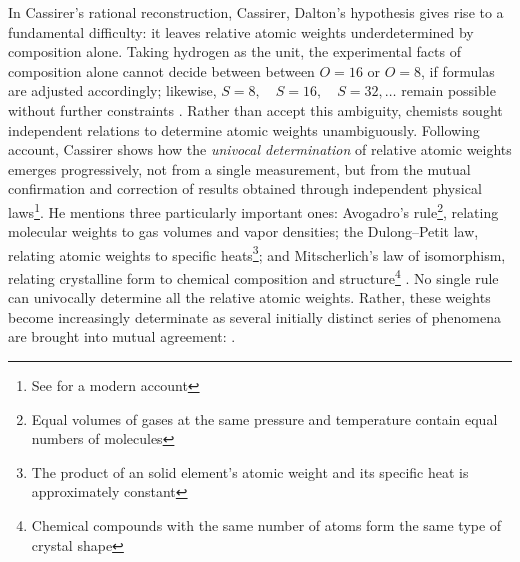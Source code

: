 \documentclass[submitted,12pt]{article}
\begin{document}
In Cassirer's rational reconstruction, Cassirer, Dalton's hypothesis gives rise to a fundamental difficulty: it leaves relative atomic weights underdetermined by composition alone. Taking hydrogen as the unit, the experimental facts of composition alone cannot decide between between $O=16$ or $O=8$, if formulas are adjusted accordingly; likewise, $S=8, \quad S=16, \quad S=32, \ldots$ remain possible without further constraints . Rather than accept this ambiguity, chemists sought independent relations to determine atomic weights unambiguously. Following  account, Cassirer shows how the \emph{univocal determination} of relative atomic weights emerges progressively, not from a single measurement, but from the mutual confirmation and correction of results obtained through independent physical laws\footnote{See \cite{Norton2024} for a modern account}. He mentions three particularly important ones: Avogadro's rule\footnote{Equal volumes of gases at the same pressure and temperature contain equal numbers of molecules}, relating molecular weights to gas volumes and vapor densities; the Dulong--Petit law, relating atomic weights to specific heats\footnote{The product of an solid element's atomic weight and its specific heat is approximately constant}; and Mitscherlich's law of isomorphism, relating crystalline form to chemical composition and structure\footnote{Chemical compounds with the same number of atoms form the same type of crystal shape} . No single rule can univocally determine all the relative atomic weights. Rather, these weights become increasingly determinate as several initially distinct series of phenomena are brought into mutual agreement:  .
\end{document}
